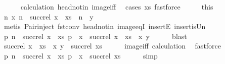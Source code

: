 \begin{isabellebody}
\ \ \ \ \isamarkupfalse%
\ calculation\ head{\isacharunderscore}notin\ image{\isacharunderscore}iff\ \isamarkupfalse%
\ {\isacharparenleft}cases\ xs{\isacharcomma}\ fastforce{\isacharplus}{\isacharparenright}\isanewline
\ \ \isamarkupfalse%
\ \isamarkupfalse%
\ this\ \isamarkupfalse%
\ {\isachardoublequoteopen}{\isasymAnd}n{\isachardot}\ {\isacharparenleft}x{\isacharcomma}\ n{\isacharparenright}\ {\isasymin}\ succ{\isacharunderscore}rel\ {\isacharparenleft}x\ {\isacharhash}\ xs{\isacharparenright}\ {\isasymLongrightarrow}\ n\ {\isacharequal}\ y{\isachardoublequoteclose}\isanewline
\ \ \ \ \isamarkupfalse%
\ {\isacharparenleft}metis\ Pair{\isacharunderscore}inject\ fst{\isacharunderscore}conv\ head{\isacharunderscore}notin\ image{\isacharunderscore}eqI\ insertE\ insert{\isacharunderscore}is{\isacharunderscore}Un{\isacharparenright}\isanewline
\ \ \isamarkupfalse%
\ {\isachardoublequoteopen}{\isacharbraceleft}{\isacharparenleft}p{\isacharcomma}\ n{\isacharparenright}\ {\isasymin}\ succ{\isacharunderscore}rel\ {\isacharparenleft}x\ {\isacharhash}\ xs{\isacharparenright}{\isachardot}\ p\ {\isasymnoteq}\ x{\isacharbraceright}\ {\isacharequal}\ succ{\isacharunderscore}rel\ {\isacharparenleft}x\ {\isacharhash}\ xs{\isacharparenright}\ {\isacharminus}\ {\isacharbraceleft}{\isacharparenleft}x{\isacharcomma}\ y{\isacharparenright}{\isacharbraceright}{\isachardoublequoteclose}\isanewline
\ \ \ \ \isamarkupfalse%
\ blast\isanewline
\ \ \isamarkupfalse%
\ \isamarkupfalse%
\ {\isachardoublequoteopen}succ{\isacharunderscore}rel\ {\isacharparenleft}x\ {\isacharhash}\ xs{\isacharparenright}\ {\isacharminus}\ {\isacharbraceleft}{\isacharparenleft}x{\isacharcomma}\ y{\isacharparenright}{\isacharbraceright}\ {\isacharequal}\ succ{\isacharunderscore}rel\ xs{\isachardoublequoteclose}\isanewline
\ \ \ \ \isamarkupfalse%
\ image{\isacharunderscore}iff\ calculation\ \isamarkupfalse%
\ fastforce\isanewline
\ \ \isamarkupfalse%
\ \isamarkupfalse%
\ {\isachardoublequoteopen}{\isacharbraceleft}{\isacharparenleft}p{\isacharcomma}\ n{\isacharparenright}\ {\isasymin}\ succ{\isacharunderscore}rel\ {\isacharparenleft}x\ {\isacharhash}\ xs{\isacharparenright}{\isachardot}\ p\ {\isasymnoteq}\ x{\isacharbraceright}\ {\isacharequal}\ succ{\isacharunderscore}rel\ xs{\isachardoublequoteclose}\isanewline
\ \ \ \ \isamarkupfalse%
\ simp\isanewline

\end{isabellebody}
